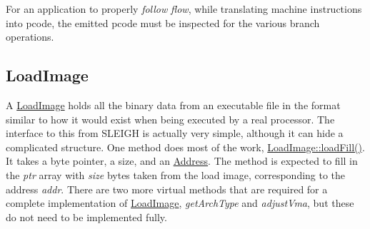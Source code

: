 For an application to properly {\itshape follow} {\itshape flow}, while translating machine instructions into pcode, the emitted pcode must be inspected for the various branch operations.\hypertarget{sleigh_a_p_ibasic_sleighloadimage}{}\subsection{Load\+Image}\label{sleigh_a_p_ibasic_sleighloadimage}
A \mbox{\hyperlink{class_load_image}{Load\+Image}} holds all the binary data from an executable file in the format similar to how it would exist when being executed by a real processor. The interface to this from S\+L\+E\+I\+GH is actually very simple, although it can hide a complicated structure. One method does most of the work, \mbox{\hyperlink{class_load_image_af00d3957284bf0b4721be0ada5ef4328}{Load\+Image\+::load\+Fill()}}. It takes a byte pointer, a size, and an \mbox{\hyperlink{class_address}{Address}}. The method is expected to fill in the {\itshape ptr} array with {\itshape size} bytes taken from the load image, corresponding to the address {\itshape addr}. There are two more virtual methods that are required for a complete implementation of \mbox{\hyperlink{class_load_image}{Load\+Image}}, {\itshape get\+Arch\+Type} and {\itshape adjust\+Vma}, but these do not need to be implemented fully.


